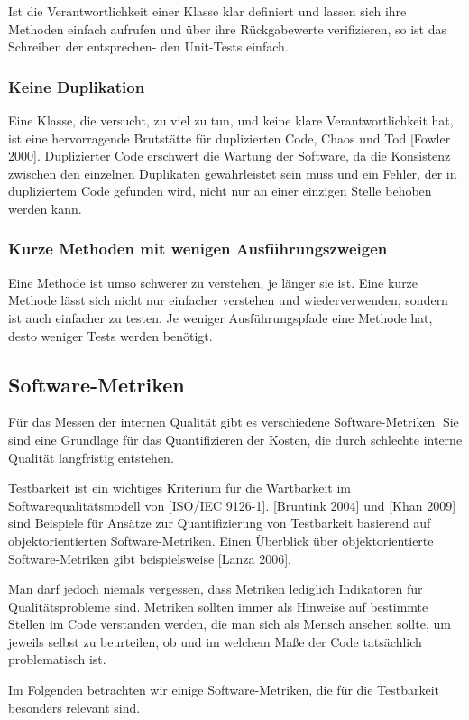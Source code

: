 Ist die Verantwortlichkeit einer Klasse klar definiert und lassen sich ihre Methoden einfach
aufrufen und über ihre Rückgabewerte verifizieren, so ist das Schreiben der entsprechen-
den Unit-Tests einfach.

\subsubsection{Keine Duplikation}
Eine Klasse, die versucht, zu viel zu tun, und keine klare Verantwortlichkeit hat, ist eine
hervorragende Brutstätte für duplizierten Code, Chaos und Tod [Fowler 2000]. Duplizierter
Code erschwert die Wartung der Software, da die Konsistenz zwischen den einzelnen Duplikaten gewährleistet sein muss und ein Fehler, der in dupliziertem Code gefunden wird,
nicht nur an einer einzigen Stelle behoben werden kann.

\subsubsection{Kurze Methoden mit wenigen Ausführungszweigen}
Eine Methode ist umso schwerer zu verstehen, je länger sie ist. Eine kurze Methode lässt
sich nicht nur einfacher verstehen und wiederverwenden, sondern ist auch einfacher zu
testen. Je weniger Ausführungspfade eine Methode hat, desto weniger Tests werden benötigt.

\subsection{Software-Metriken}
Für das Messen der internen Qualität gibt es verschiedene Software-Metriken. Sie sind eine
Grundlage für das Quantifizieren der Kosten, die durch schlechte interne Qualität langfristig entstehen.

Testbarkeit ist ein wichtiges Kriterium für die Wartbarkeit im Softwarequalitätsmodell von
[ISO/IEC 9126-1]. [Bruntink 2004] und [Khan 2009] sind Beispiele für Ansätze zur Quantifizierung von Testbarkeit basierend auf objektorientierten Software-Metriken. Einen Überblick über objektorientierte Software-Metriken gibt beispielsweise [Lanza 2006].

Man darf jedoch niemals vergessen, dass Metriken lediglich Indikatoren für Qualitätsprobleme sind. Metriken sollten immer als Hinweise auf bestimmte Stellen im Code verstanden werden,
die man sich als Mensch ansehen sollte, um jeweils selbst zu beurteilen, ob und im welchem Maße der Code tatsächlich problematisch ist.

Im Folgenden betrachten wir einige Software-Metriken, die für die Testbarkeit besonders relevant sind.

